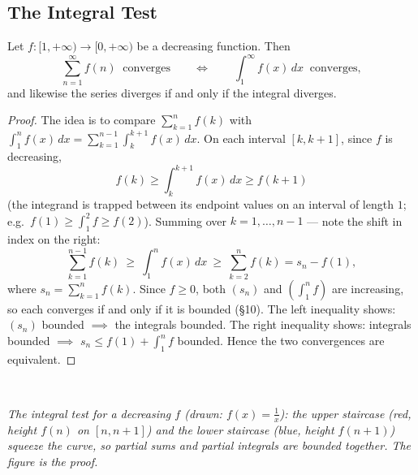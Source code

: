 \documentclass[11pt]{report}
\newcommand{\figcap}[1]{\\[1.5mm]\parbox{0.92\textwidth}{\small\itshape #1}}
\begin{document}
\subsection{The Integral Test}

\begin{thmbox}
Let $f: [1, +\infty) \to [0, +\infty)$ be a decreasing function. Then
\[
\sum_{n=1}^{\infty} f(n) \ \text{ converges} \qquad \Longleftrightarrow \qquad \int_1^{\infty} f(x)\, dx \ \text{ converges},
\]
and likewise the series diverges if and only if the integral diverges.
\end{thmbox}

\begin{proof}
The idea is to compare $\sum_{k=1}^n f(k)$ with $\int_1^n f(x)\,dx = \sum_{k=1}^{n-1} \int_k^{k+1} f(x)\,dx$. On each interval $[k, k+1]$, since $f$ is decreasing,
\[
f(k) \geq \int_k^{k+1} f(x)\, dx \geq f(k+1)
\]
(the integrand is trapped between its endpoint values on an interval of length $1$; e.g.\ $f(1) \geq \int_1^2 f \geq f(2)$). Summing over $k = 1, \ldots, n-1$ --- note the shift in index on the right:
\[
\sum_{k=1}^{n-1} f(k) \ \geq\ \int_1^n f(x)\, dx \ \geq\ \sum_{k=2}^{n} f(k) = s_n - f(1),
\]
where $s_n = \sum_{k=1}^n f(k)$. Since $f \geq 0$, both $(s_n)$ and $\left( \int_1^n f \right)$ are increasing, so each converges if and only if it is bounded (\S 10). The left inequality shows: $(s_n)$ bounded $\implies$ the integrals bounded. The right inequality shows: integrals bounded $\implies$ $s_n \leq f(1) + \int_1^n f$ bounded. Hence the two convergences are equivalent.
\end{proof}

\begin{center}
\figcap{The integral test for a decreasing $f$ (drawn: $f(x) = \tfrac1x$): the upper staircase (red, height $f(n)$ on $[n, n+1]$) and the lower staircase (blue, height $f(n+1)$) squeeze the curve, so partial sums and partial integrals are bounded together. The figure is the proof.}
\end{center}
\end{document}
